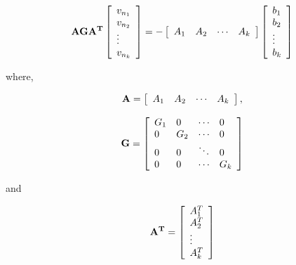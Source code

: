 \documentclass[10pt,psfig,letterpaper,twocolumn]{article}
\begin{document}
\begin{equation}
\bf{AGA^{T}}
\left[\begin{array}{l}
v_{n_{1}}\\
v_{n_{2}}\\
{\vdots}\\
v_{n_{k}}\\
\end{array}\right] = - 
\left[\begin{array}{llll}  
A_{1} & A_{2} & {\cdots} & A_{k}
\end{array}\right]
\left[\begin{array}{l}
b_{1}\\
b_{2}\\
{\vdots}\\
b_{k}\\
\end{array}\right]
\label{algo4}
\end{equation}


where,\par
$$ {\bf {A}} = \left[\begin{array}{llll}
A_{1} & A_{2} &{\cdots} & A_{k}
\end{array}\right],$$ \par
$$ {\bf {G}} = \left[\begin{array}{llll}
G_{1} &  0 & {\cdots} & 0\\ 
0  & G_{2} & {\cdots} & 0\\ 
0 & 0 & {\ddots} & 0\\ 
0 & 0 & {\cdots} & G_{k}\\ 
\end{array}\right] $$ \par
and \par
$$ {\bf {A^{T}}} =
\left[\begin{array}{l}
A_{1}^{T}\\
A_{2}^{T}\\
{\vdots}\\
A_{k}^{T}\\
\end{array}\right] $$
\end{document}
